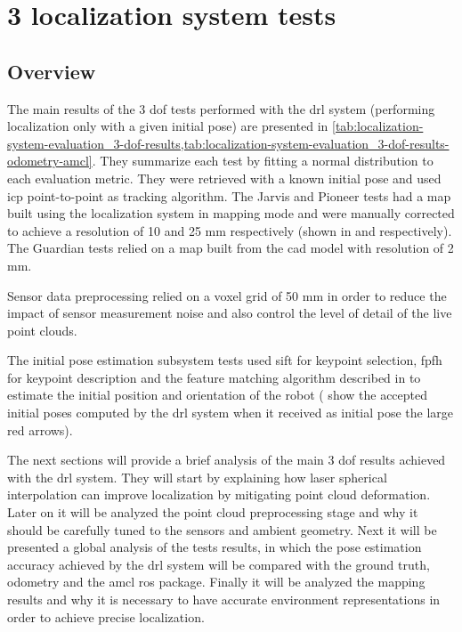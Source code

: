\section{3  localization system tests}\label{sec:planar-localization-system-tests}


\subsection{Overview}

The main results of the 3 \gls{dof} tests performed with the \gls{drl} system (performing localization only with a given initial pose) are presented in \cref{tab:localization-system-evaluation_3-dof-results,tab:localization-system-evaluation_3-dof-results-odometry-amcl}. They summarize each test by fitting a normal distribution to each evaluation metric. They were retrieved with a known initial pose and used \gls{icp} point-to-point as tracking algorithm. The Jarvis and Pioneer tests had a map built using the localization system in mapping mode and were manually corrected to achieve a resolution of 10 and 25 mm respectively (shown in  and  respectively). The Guardian tests relied on a map built from the \gls{cad} model with resolution of 2 mm.

Sensor data preprocessing relied on a voxel grid of 50 mm in order to reduce the impact of sensor measurement noise and also control the level of detail of the live point clouds.

The initial pose estimation subsystem tests used \gls{sift} for keypoint selection, \gls{fpfh} for keypoint description and the feature matching algorithm described in  to estimate the initial position and orientation of the robot ( show the accepted initial poses computed by the \gls{drl} system when it received as initial pose the large red arrows).

The next sections will provide a brief analysis of the main 3 \gls{dof} results achieved with the \gls{drl} system. They will start by explaining how laser spherical interpolation can improve localization by mitigating point cloud deformation. Later on it will be analyzed the point cloud preprocessing stage and why it should be carefully tuned to the sensors and ambient geometry. Next it will be presented a global analysis of the tests results, in which the pose estimation accuracy achieved by the \gls{drl} system will be compared with the ground truth, odometry and the \gls{amcl} \gls{ros} package. Finally it will be analyzed the mapping results and why it is necessary to have accurate environment representations in order to achieve precise localization.


